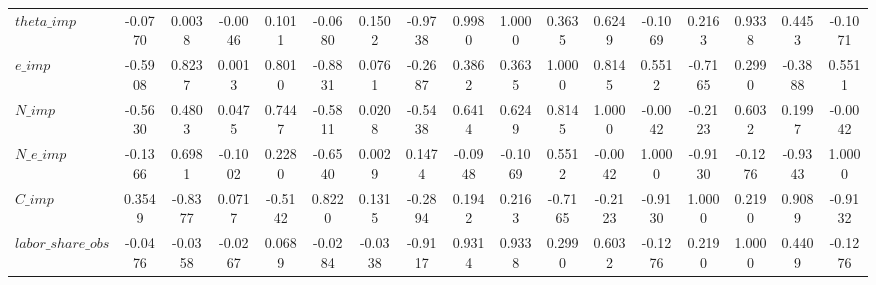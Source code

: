 \begin{center}
\begin{longtable}{lcccccccccccccccc}
$theta\_imp         $	 & 	              -0.0770	 & 	               0.0038	 & 	              -0.0046	 & 	               0.1011	 & 	              -0.0680	 & 	               0.1502	 & 	              -0.9738	 & 	               0.9980	 & 	               1.0000	 & 	               0.3635	 & 	               0.6249	 & 	              -0.1069	 & 	               0.2163	 & 	               0.9338	 & 	               0.4453	 & 	              -0.1071 \\ 
$e\_imp             $	 & 	              -0.5908	 & 	               0.8237	 & 	               0.0013	 & 	               0.8010	 & 	              -0.8831	 & 	               0.0761	 & 	              -0.2687	 & 	               0.3862	 & 	               0.3635	 & 	               1.0000	 & 	               0.8145	 & 	               0.5512	 & 	              -0.7165	 & 	               0.2990	 & 	              -0.3888	 & 	               0.5511 \\ 
$N\_imp             $	 & 	              -0.5630	 & 	               0.4803	 & 	               0.0475	 & 	               0.7447	 & 	              -0.5811	 & 	               0.0208	 & 	              -0.5438	 & 	               0.6414	 & 	               0.6249	 & 	               0.8145	 & 	               1.0000	 & 	              -0.0042	 & 	              -0.2123	 & 	               0.6032	 & 	               0.1997	 & 	              -0.0042 \\ 
$N\_e\_imp          $	 & 	              -0.1366	 & 	               0.6981	 & 	              -0.1002	 & 	               0.2280	 & 	              -0.6540	 & 	               0.0029	 & 	               0.1474	 & 	              -0.0948	 & 	              -0.1069	 & 	               0.5512	 & 	              -0.0042	 & 	               1.0000	 & 	              -0.9130	 & 	              -0.1276	 & 	              -0.9343	 & 	               1.0000 \\ 
$C\_imp             $	 & 	               0.3549	 & 	              -0.8377	 & 	               0.0717	 & 	              -0.5142	 & 	               0.8220	 & 	               0.1315	 & 	              -0.2894	 & 	               0.1942	 & 	               0.2163	 & 	              -0.7165	 & 	              -0.2123	 & 	              -0.9130	 & 	               1.0000	 & 	               0.2190	 & 	               0.9089	 & 	              -0.9132 \\ 
$labor\_share\_obs  $	 & 	              -0.0476	 & 	              -0.0358	 & 	              -0.0267	 & 	               0.0689	 & 	              -0.0284	 & 	              -0.0338	 & 	              -0.9117	 & 	               0.9314	 & 	               0.9338	 & 	               0.2990	 & 	               0.6032	 & 	              -0.1276	 & 	               0.2190	 & 	               1.0000	 & 	               0.4409	 & 	              -0.1276 \\ 

\end{longtable}
\end{center}
